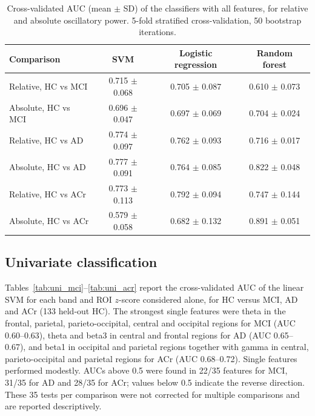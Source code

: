 \documentclass[11pt]{article}
\begin{document}
\begin{table}[ht]
\centering
\caption{Cross-validated AUC (mean $\pm$ SD) of the classifiers with all features, for relative and absolute oscillatory power. 5-fold stratified cross-validation, 50 bootstrap iterations.}
\label{tab:ab_cls}
\small
\begin{tabular}{@{}lccc@{}}
\toprule
Comparison & SVM & Logistic regression & Random forest \\
\midrule
Relative, HC vs MCI & 0.715 $\pm$ 0.068 & 0.705 $\pm$ 0.087 & 0.610 $\pm$ 0.073 \\
Absolute, HC vs MCI & 0.696 $\pm$ 0.047 & 0.697 $\pm$ 0.069 & 0.704 $\pm$ 0.024 \\
\midrule
Relative, HC vs AD & 0.774 $\pm$ 0.097 & 0.762 $\pm$ 0.093 & 0.716 $\pm$ 0.017 \\
Absolute, HC vs AD & 0.777 $\pm$ 0.091 & 0.764 $\pm$ 0.085 & 0.822 $\pm$ 0.048 \\
\midrule
Relative, HC vs ACr & 0.773 $\pm$ 0.113 & 0.792 $\pm$ 0.094 & 0.747 $\pm$ 0.144 \\
Absolute, HC vs ACr & 0.579 $\pm$ 0.058 & 0.682 $\pm$ 0.132 & 0.891 $\pm$ 0.051 \\
\bottomrule
\end{tabular}
\end{table}

\subsection{Univariate classification}
Tables~\ref{tab:uni_mci}--\ref{tab:uni_acr} report the cross-validated AUC of the linear SVM for each band and ROI $z$-score considered alone, for HC versus MCI, AD and ACr (133 held-out HC). The strongest single features were theta in the frontal, parietal, parieto-occipital, central and occipital regions for MCI (AUC 0.60--0.63), theta and beta3 in central and frontal regions for AD (AUC 0.65--0.67), and beta1 in occipital and parietal regions together with gamma in central, parieto-occipital and parietal regions for ACr (AUC 0.68--0.72). Single features performed modestly. AUCs above 0.5 were found in 22/35 features for MCI, 31/35 for AD and 28/35 for ACr; values below 0.5 indicate the reverse direction. These 35 tests per comparison were not corrected for multiple comparisons and are reported descriptively.
\end{document}
